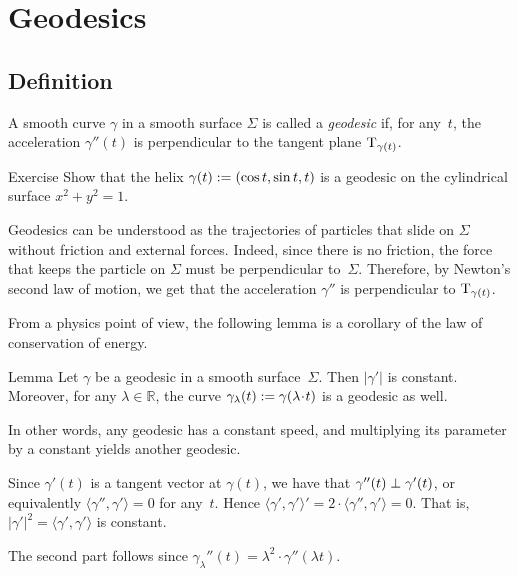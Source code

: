 \chapter{Geodesics}
\label{chap:geodesics}


\section{Definition}

A smooth curve $\gamma$ in a smooth surface $\Sigma$ is called a \emph{geodesic} if, for any~$t$, the acceleration $\gamma''(t)$ is perpendicular to the tangent plane $\mathrm{T}_{\gamma(t)}$.

\begin{thm}{Exercise}\label{ex:helix-geodesic}
Show that the helix $\gamma(t)\z\df(\cos t,\sin t, t)$ is a geodesic on the cylindrical surface $x^2+y^2=1$.
\end{thm}


Geodesics can be understood as the trajectories of particles that slide on $\Sigma$ without friction and external forces.
Indeed, since there is no friction, the force that keeps the particle on $\Sigma$ must be perpendicular to~$\Sigma$.
Therefore, by Newton's second law of motion,
we get that the acceleration $\gamma''$ is perpendicular to $\mathrm{T}_{\gamma(t)}$.

From a physics point of view, the following lemma is a corollary of the law of conservation of energy.


\begin{thm}{Lemma}\label{lem:constant-speed}
Let $\gamma$ be a geodesic in a smooth surface~$\Sigma$. 
Then $|\gamma'|$ is constant.
Moreover, for any $\lambda\in\mathbb{R}$, the curve 
$\gamma_{\lambda}(t)\df \gamma (\lambda\cdot t)$ is a geodesic as well. 
\end{thm}

In other words, any geodesic has a constant speed, and multiplying its parameter by a constant yields another geodesic.

Since $\gamma'(t)$ is a tangent vector at $\gamma(t)$,
we have that $\gamma''(t)\z\perp\gamma'(t)$, or equivalently $\langle\gamma'',\gamma'\rangle=0$ for any~$t$.
Hence 
$\langle\gamma',\gamma'\rangle'=2\cdot \langle\gamma'',\gamma'\rangle=0$.
That is, $|\gamma'|^2=\langle\gamma',\gamma'\rangle$ is constant.

The second part follows since 
$\gamma_{\lambda}''(t) =\lambda^2\cdot \gamma''(\lambda t)$.
\qeds


